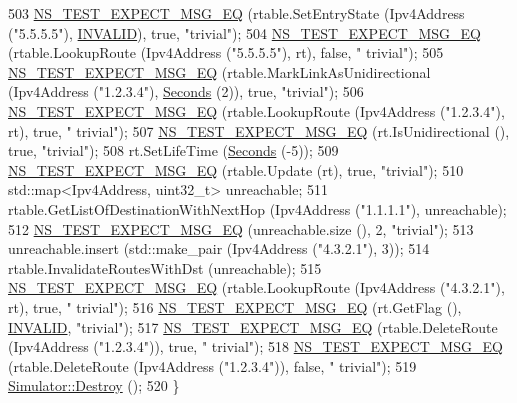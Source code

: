 \begin{DoxyCode}
503     \hyperlink{group__testing_ga7304ba46a28d8cf08dfdfd6499cf7068}{NS\_TEST\_EXPECT\_MSG\_EQ} (rtable.SetEntryState (Ipv4Address (\textcolor{stringliteral}{"5.5.5.5"}), 
      \hyperlink{group__aodv_gga44216921a9c725a5ab8bc19059052a26a0d7b8118b2af9344a91683148f1261c3}{INVALID}), \textcolor{keyword}{true}, \textcolor{stringliteral}{"trivial"});
504     \hyperlink{group__testing_ga7304ba46a28d8cf08dfdfd6499cf7068}{NS\_TEST\_EXPECT\_MSG\_EQ} (rtable.LookupRoute (Ipv4Address (\textcolor{stringliteral}{"5.5.5.5"}), rt), \textcolor{keyword}{false}, \textcolor{stringliteral}{"
      trivial"});
505     \hyperlink{group__testing_ga7304ba46a28d8cf08dfdfd6499cf7068}{NS\_TEST\_EXPECT\_MSG\_EQ} (rtable.MarkLinkAsUnidirectional (Ipv4Address (\textcolor{stringliteral}{"1.2.3.4"}), 
      \hyperlink{group__timecivil_ga33c34b816f8ff6628e33d5c8e9713b9e}{Seconds} (2)), \textcolor{keyword}{true}, \textcolor{stringliteral}{"trivial"});
506     \hyperlink{group__testing_ga7304ba46a28d8cf08dfdfd6499cf7068}{NS\_TEST\_EXPECT\_MSG\_EQ} (rtable.LookupRoute (Ipv4Address (\textcolor{stringliteral}{"1.2.3.4"}), rt), \textcolor{keyword}{true}, \textcolor{stringliteral}{"
      trivial"});
507     \hyperlink{group__testing_ga7304ba46a28d8cf08dfdfd6499cf7068}{NS\_TEST\_EXPECT\_MSG\_EQ} (rt.IsUnidirectional (), \textcolor{keyword}{true}, \textcolor{stringliteral}{"trivial"});
508     rt.SetLifeTime (\hyperlink{group__timecivil_ga33c34b816f8ff6628e33d5c8e9713b9e}{Seconds} (-5));
509     \hyperlink{group__testing_ga7304ba46a28d8cf08dfdfd6499cf7068}{NS\_TEST\_EXPECT\_MSG\_EQ} (rtable.Update (rt), \textcolor{keyword}{true}, \textcolor{stringliteral}{"trivial"});
510     std::map<Ipv4Address, uint32\_t> unreachable;
511     rtable.GetListOfDestinationWithNextHop (Ipv4Address (\textcolor{stringliteral}{"1.1.1.1"}), unreachable);
512     \hyperlink{group__testing_ga7304ba46a28d8cf08dfdfd6499cf7068}{NS\_TEST\_EXPECT\_MSG\_EQ} (unreachable.size (), 2, \textcolor{stringliteral}{"trivial"});
513     unreachable.insert (std::make\_pair (Ipv4Address (\textcolor{stringliteral}{"4.3.2.1"}), 3));
514     rtable.InvalidateRoutesWithDst (unreachable);
515     \hyperlink{group__testing_ga7304ba46a28d8cf08dfdfd6499cf7068}{NS\_TEST\_EXPECT\_MSG\_EQ} (rtable.LookupRoute (Ipv4Address (\textcolor{stringliteral}{"4.3.2.1"}), rt), \textcolor{keyword}{true}, \textcolor{stringliteral}{"
      trivial"});
516     \hyperlink{group__testing_ga7304ba46a28d8cf08dfdfd6499cf7068}{NS\_TEST\_EXPECT\_MSG\_EQ} (rt.GetFlag (), \hyperlink{group__aodv_gga44216921a9c725a5ab8bc19059052a26a0d7b8118b2af9344a91683148f1261c3}{INVALID}, \textcolor{stringliteral}{"trivial"});
517     \hyperlink{group__testing_ga7304ba46a28d8cf08dfdfd6499cf7068}{NS\_TEST\_EXPECT\_MSG\_EQ} (rtable.DeleteRoute (Ipv4Address (\textcolor{stringliteral}{"1.2.3.4"})), \textcolor{keyword}{true}, \textcolor{stringliteral}{"
      trivial"});
518     \hyperlink{group__testing_ga7304ba46a28d8cf08dfdfd6499cf7068}{NS\_TEST\_EXPECT\_MSG\_EQ} (rtable.DeleteRoute (Ipv4Address (\textcolor{stringliteral}{"1.2.3.4"})), \textcolor{keyword}{false}, \textcolor{stringliteral}{"
      trivial"});
519     \hyperlink{classns3_1_1Simulator_a2a056e59a6623225df0957eda0ee8252}{Simulator::Destroy} ();
520   \}
\end{DoxyCode}


